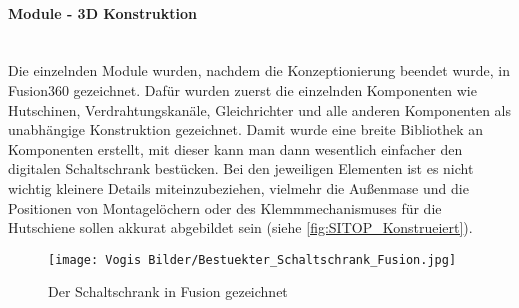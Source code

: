     \paragraph{Module - 3D Konstruktion}\mbox{}\\
    Die einzelnden Module wurden, nachdem die Konzeptionierung beendet wurde, in Fusion360 gezeichnet. Dafür wurden zuerst die einzelnden Komponenten wie Hutschinen, Verdrahtungskanäle, Gleichrichter und alle anderen Komponenten als unabhängige Konstruktion gezeichnet. Damit wurde eine breite Bibliothek an Komponenten erstellt, mit dieser kann man dann wesentlich einfacher den digitalen Schaltschrank bestücken. Bei den jeweiligen Elementen ist es nicht wichtig kleinere Details miteinzubeziehen, vielmehr die Außenmase und die Positionen von Montagelöchern oder des Klemmmechanismuses für die Hutschiene sollen akkurat abgebildet sein (siehe \ref{fig:SITOP_Konstrueiert}).
    \begin{figure}[h]
        \centering
        \texttt{[image: Vogis Bilder/Bestuekter\_Schaltschrank\_Fusion.jpg]}
        \caption{Der Schaltschrank in Fusion gezeichnet}
        \label{fig:Schaltschrank_bestueckt_Fusion}
    \end{figure}
